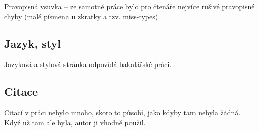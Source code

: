 \documentclass[a4paper, 12pt]{article}
\begin{document}
Pravopisná vsuvka -- ze samotné práce bylo pro čtenáře nejvíce rušivé pravopisné chyby (malé písmena u zkratky  a tzv. miss-types)
\subsection{Jazyk, styl}
Jazyková a stylová stránka odpovídá bakalářské práci.
\subsection{Citace}
Citací v práci nebylo mnoho, skoro to působí, jako kdyby tam nebyla žádná. Když už tam ale byla, autor ji vhodně použil.
\end{document}
